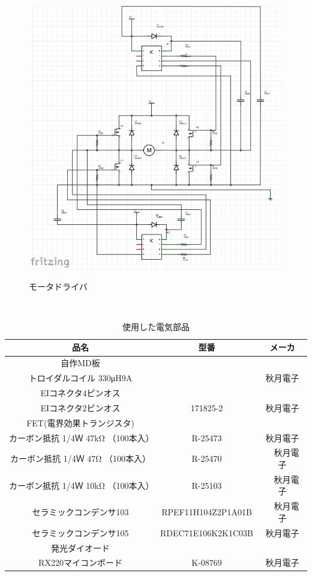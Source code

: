 \documentclass[12pt,oneside]{sotsuken_paper}
\begin{document}
\begin{figure}[htp] 
 \begin{center} 
  \includegraphics[width=140mm]{img/hard/kairozu.png} 
 　\caption{モータドライバ} 
  \label{fig:denkikairo}%
 \end{center} 
\end{figure} 


\begin{table}[htp] 
 　\begin{center} 
    \caption{使用した電気部品} 
  \begin{tabular}{|c|c|c|} \hline 
品名 & 型番 & メーカ &  \\  \hline 
自作MD板  & \\ \hline 
トロイダルコイル 330μH9A  &  &秋月電子\\ \hline 
EIコネクタ4ピンオス  & 　& \\ \hline 
EIコネクタ2ピンオス  & 171825-2 & 秋月電子 \\ \hline 
FET(電界効果トランジスタ) & \\ \hline 
カーボン抵抗 1/4Ｗ 47kΩ （100本入） & R-25473 & 秋月電子\\ \hline 
カーボン抵抗 1/4Ｗ 47Ω （100本入） &  R-25470 &　秋月電子\\ \hline 
カーボン抵抗 1/4Ｗ 10kΩ （100本入） & R-25103 &　秋月電子\\ \hline 
セラミックコンデンサ103 & RPEF11H104Z2P1A01B &　秋月電子 \\ \hline 
セラミックコンデンサ105 & RDEC71E106K2K1C03B & 秋月電子 \\ \hline 
発光ダイオード &  \\ \hline 
RX220マイコンボード & K-08769 & 秋月電子\\ \hline 
  \end{tabular} 
　   \label{tab:denkibuhin} 
  \end{center} 
\end{table} 
\end{document}
